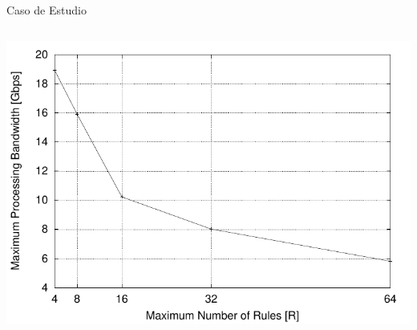 \documentclass[xcolor=dvipsnames]{beamer}
\begin{document}
\begin{frame}{Caso de Estudio}
\begin{block}
\begin{columns}
    \begin{column}{0.4\textwidth}
      \center
      \includegraphics[scale=0.35]{figures/bw}
    \end{column}
  \end{columns}  

\end{block}


\end{frame}
\end{document}
